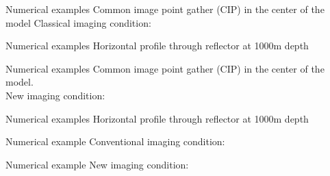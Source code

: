 \documentclass[xcolor=dvipsnames,notes]{beamer}
\begin{document}
\begin{frame}{Numerical examples}
Common image point gather (CIP) in the center of the model
Classical imaging condition:
\begin{figure}
\end{figure}
\end{frame}
\begin{frame}{Numerical examples}
Horizontal profile through reflector at 1000m depth
\begin{figure}
\end{figure}
\end{frame}
\begin{frame}{Numerical examples}
Common image point gather (CIP) in the center of the model.\\
New imaging condition:
\begin{figure}
\end{figure}
\end{frame}
\begin{frame}{Numerical examples}
Horizontal profile through reflector at 1000m depth
\begin{figure}
\end{figure}
\end{frame}
\begin{frame}{Numerical example}
Conventional imaging condition:
\begin{figure}
\end{figure}
\end{frame}
\begin{frame}{Numerical example}
New imaging condition:
\begin{figure}
\end{figure}
\end{frame}
\end{document}
